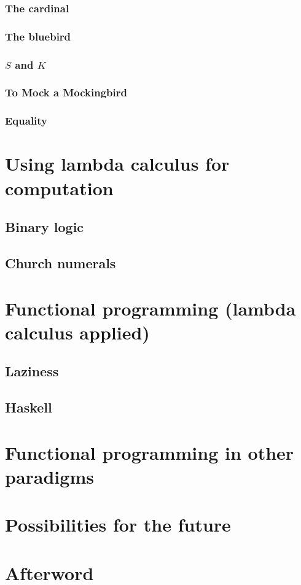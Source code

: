 \documentclass[11pt]{article}
\begin{document}
\subsubsection{The cardinal}

\subsubsection{The bluebird}

\subsubsection{\(S\) and \(K\)}

\subsubsection{To Mock a Mockingbird}

\subsubsection{Equality}

\section{Using lambda calculus for computation}

\subsection{Binary logic}

\subsection{Church numerals}

\section{Functional programming (lambda calculus applied)}

\subsection{Laziness}


\subsection{Haskell}

\section{Functional programming in other paradigms}

\section{Possibilities for the future}

\section{Afterword}

\newpage
\printbibliography[heading=bibintoc, title={References}]
\end{document}
